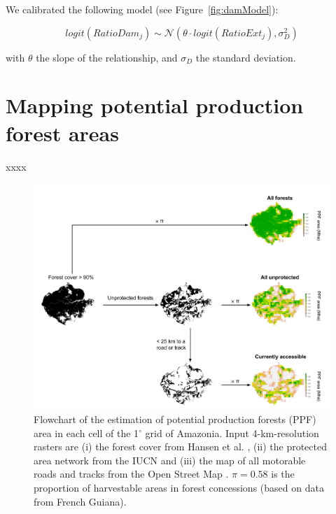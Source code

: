 \documentclass{article}
\begin{document}
We calibrated the following model (see Figure~\ref{fig:damModel}): 

\begin{equation}
logit(RatioDam_j) \sim \mathcal{N}(\theta \cdot logit(RatioExt_j), \sigma_D^2)
\end{equation} 

with $\theta$ the slope of the relationship, and $\sigma_D$ the standard deviation. 


\clearpage

\section{Mapping potential production forest areas}

\label{sec:defPPF}

xxxx

\begin{figure}
    \centering
    \includegraphics[width=\linewidth]{graphs/PPFareaDiagram.pdf}
    \caption{Flowchart of the estimation of potential production forests (PPF) area in each cell of the 1$^{\circ}$ grid of Amazonia. Input 4-km-resolution rasters are (i) the forest cover from Hansen et al. \cite{Hansen2013}, (ii) the protected area network from the IUCN \cite{WDPA2016} and (iii) the map of all motorable roads and tracks from the Open Street Map \cite{OSM2018}. $\pi = 0.58$ is the proportion of harvestable areas in forest concessions (based on data from French Guiana). }
    \label{fig:ppfDiagram}
\end{figure}

\clearpage
\end{document}
